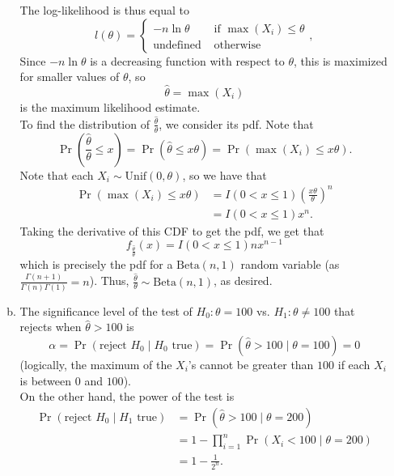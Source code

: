 \documentclass[11pt]{article}
\begin{document}
\begin{enumerate}
\begin{enumerate}[a)]
        The log-likelihood is thus equal to
        \[
            l(\theta) = \begin{cases}
                -n \ln \theta &\text{ if } \max (X_i) \leq \theta \\
                \text{undefined} &\text{ otherwise}
            \end{cases},
        \]
        Since $-n \ln \theta$ is a decreasing function with respect to $\theta$, this is maximized for smaller values of $\theta$, so
        \[
            \boxed{\hat{\theta} = \max (X_i)}
        \]
        is the maximum likelihood estimate. \\

        To find the distribution of $\frac{\hat{\theta}}{\theta}$, we consider its pdf. Note that
        \[
            \Pr \left(\frac{\hat{\theta}}{\theta} \leq x \right) = \Pr (\hat{\theta} \leq x\theta) = \Pr (\max (X_i) \leq x\theta). 
        \] 
        Note that each $X_i \sim \mathrm{Unif}(0, \theta)$, so we have that
        \begin{align*}
            \Pr (\max (X_i) \leq x\theta) &= I(0 < x \leq 1) \left( \frac{x\theta}{\theta} \right)^n \\
            &= I(0 < x \leq 1) x^n.
        \end{align*}
        Taking the derivative of this CDF to get the pdf, we get that
        \[
            f_{\frac{\hat{\theta}}{\theta}}(x) = I(0 < x \leq 1) nx^{n-1}
        \]
        which is precisely the pdf for a $\mathrm{Beta}(n, 1)$ random variable (as $\frac{\Gamma(n+1)}{\Gamma(n)\Gamma(1)} = n$). 
        Thus, $\frac{\hat{\theta}}{\theta} \sim \mathrm{Beta}(n, 1)$, as desired. 

    \item The significance level of the test of $H_0 \colon \theta = 100$ vs. $H_1 \colon \theta \neq 100$ that rejects when $\hat{\theta} > 100$ is 
    \[
        \alpha = \Pr(\text{reject $H_0$} \mid H_0 \text{ true}) = \Pr (\hat{\theta} > 100 \mid \theta = 100) = \boxed{0}  
    \]
    (logically, the maximum of the $X_i$'s cannot be greater than $100$ if each $X_i$ is between $0$ and $100$). \\
    
    On the other hand, the power of the test is
    \begin{align*}
        \Pr (\text{reject $H_0$} \mid H_1 \text{ true}) &= \Pr (\hat{\theta} > 100 \mid \theta = 200) \\
        &= 1 - \prod_{i=1}^n \Pr (X_i < 100 \mid \theta = 200) \\
        &= \boxed{1 - \frac{1}{2^n}}.
    \end{align*}


\end{enumerate}
\end{enumerate}
\end{document}
